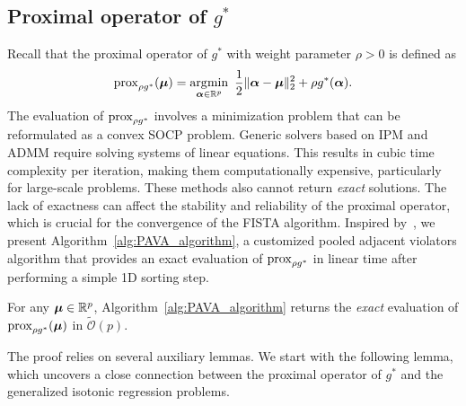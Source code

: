\subsection{Proximal operator of $g^*$}
Recall that the proximal operator of $g^*$ with weight parameter $\rho > 0$ is defined as
\begin{align}
    \label{eq:prox:g*}
    \operatorname{prox}_{\rho g^*}(\bm \mu) = \operatorname*{\arg\!\min}_{\bm \alpha \in \mathbb{R}^p} ~ \frac{1}{2} \lVert \bm \alpha - \bm \mu \rVert_2^2 + \rho g^*(\bm \alpha).
\end{align}
The evaluation of $\operatorname{prox}_{\rho g^*}$ involves a minimization problem that can be reformulated as a convex SOCP problem. 
Generic solvers based on IPM and ADMM require solving systems of linear equations. This results in cubic time complexity per iteration, making them computationally expensive, particularly for large-scale problems. 
These methods also cannot return \emph{exact} solutions. 
The lack of exactness can affect the stability and reliability of the proximal operator, which is crucial for the convergence of the FISTA algorithm. 
Inspired by~\citep{busing2022monotone}, we present Algorithm~\ref{alg:PAVA_algorithm}, a customized pooled adjacent violators algorithm that provides an exact evaluation of $\operatorname{prox}_{\rho g^*}$ in linear time after performing a simple 1D sorting step.

\begin{theorem}
    \label{theorem:pava_algorithm_linear_time_complexity_and_exact_solution}
    For any $\bm{\mu} \in \mathbb{R}^p$, Algorithm~\ref{alg:PAVA_algorithm} returns the \textit{exact} evaluation of $\operatorname{prox}_{\rho g^*}(\bm{\mu})$ in $\tilde {\mathcal O}(p)$.
\end{theorem}




The proof relies on several auxiliary lemmas.
We start with the following lemma, which uncovers a close connection between the proximal operator of $g^*$ and the generalized isotonic regression problems.

